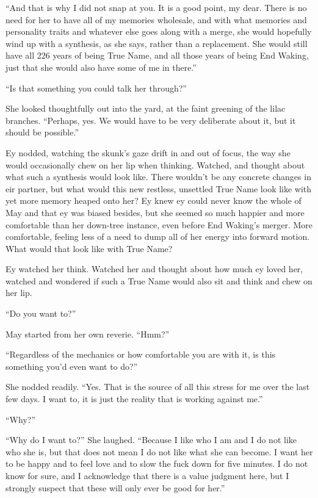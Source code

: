 ``And that is why I did not snap at you. It is a good point, my dear. There is no need for her to have all of my memories wholesale, and with what memories and personality traits and whatever else goes along with a merge, she would hopefully wind up with a synthesis, as she says, rather than a replacement. She would still have all 226 years of being True Name, and all those years of being End Waking, just that she would also have some of me in there.''

``Is that something you could talk her through?''

She looked thoughtfully out into the yard, at the faint greening of the lilac branches. ``Perhaps, yes. We would have to be very deliberate about it, but it should be possible.''

Ey nodded, watching the skunk's gaze drift in and out of focus, the way she would occasionally chew on her lip when thinking. Watched, and thought about what such a synthesis would look like. There wouldn't be any concrete changes in eir partner, but what would this new restless, unsettled True Name look like with yet more memory heaped onto her? Ey knew ey could never know the whole of May and that ey was biased besides, but she seemed so much happier and more comfortable than her down-tree instance, even before End Waking's merger. More comfortable, feeling less of a need to dump all of her energy into forward motion. What would that look like with True Name?

Ey watched her think. Watched her and thought about how much ey loved her, watched and wondered if such a True Name would also sit and think and chew on her lip.

``Do you want to?''

May started from her own reverie. ``Hmm?''

``Regardless of the mechanics or how comfortable you are with it, is this something you'd even want to do?''

She nodded readily. ``Yes. That is the source of all this stress for me over the last few days. I want to, it is just the reality that is working against me.''

``Why?''

``Why do I want to?'' She laughed. ``Because I like who I am and I do not like who she is, but that does not mean I do not like what she can become. I want her to be happy and to feel love and to slow the fuck down for five minutes. I do not know for sure, and I acknowledge that there is a value judgment here, but I strongly suspect that these will only ever be good for her.''

